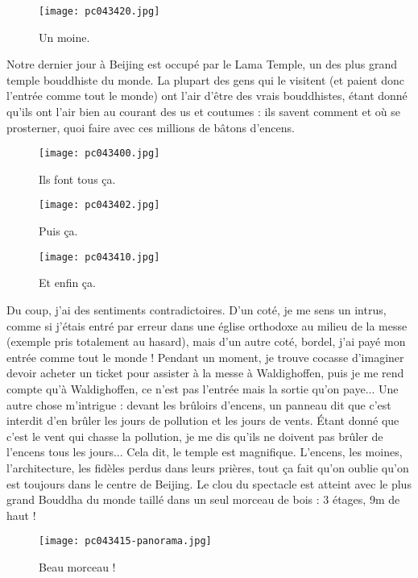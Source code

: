 \documentclass{book}
\begin{document}
\begin{figure}[H]
\centering
\texttt{[image: pc043420.jpg]}
\caption*{ Un moine.}
\end{figure}

Notre dernier jour à Beijing est occupé par le Lama Temple, un des plus grand temple bouddhiste du monde. La plupart des gens qui le visitent (et paient donc l'entrée comme tout le monde) ont l'air d'être des vrais bouddhistes, étant donné qu'ils ont l'air bien au courant des us et coutumes : ils savent comment et où se prosterner, quoi faire avec ces millions de bâtons d’encens.


\begin{figure}[H]
\centering
\texttt{[image: pc043400.jpg]}
\caption*{ Ils font tous ça.}
\end{figure}


\begin{figure}[H]
\centering
\texttt{[image: pc043402.jpg]}
\caption*{ Puis ça.}
\end{figure}


\begin{figure}[H]
\centering
\texttt{[image: pc043410.jpg]}
\caption*{ Et enfin ça.}
\end{figure}

Du coup, j'ai des sentiments contradictoires. D'un coté, je me sens un intrus, comme si j'étais entré par erreur dans une église orthodoxe au milieu de la messe (exemple pris totalement au hasard), mais d'un autre coté, bordel, j'ai payé mon entrée comme tout le monde ! Pendant un moment, je trouve cocasse d'imaginer devoir acheter un ticket pour assister à la messe à Waldighoffen, puis je me rend compte qu'à Waldighoffen, ce n'est pas l'entrée mais la sortie qu'on paye... Une autre chose m'intrigue : devant les brûloirs d’encens, un panneau dit que c'est interdit d'en brûler les jours de pollution et les jours de vents. Étant donné que c'est le vent qui chasse la pollution, je me dis qu'ils ne doivent pas brûler de l’encens tous les jours... Cela dit, le temple est magnifique. L’encens, les moines, l'architecture, les fidèles perdus dans leurs prières, tout ça fait qu'on oublie qu'on est toujours dans le centre de Beijing. Le clou du spectacle est atteint avec le plus grand Bouddha du monde taillé dans un seul morceau de bois : 3 étages, 9m de haut !


\begin{figure}[H]
\centering
\texttt{[image: pc043415-panorama.jpg]}
\caption*{ Beau morceau !}
\end{figure}
\end{document}
